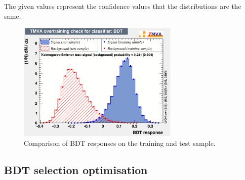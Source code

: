 The given values represent the confidence values that the distributions are the same.
\begin{figure}[tbp]
    \centering
    \includegraphics[width=0.7\textwidth]{07selection/figs/overtrain_BDT.pdf}
    \caption{Comparison of \ac{BDT} responses on the training and test sample.}
    \label{fig:BDTOVertraining}
\end{figure}

\subsection{BDT selection optimisation}
\label{sec:BDTOpt}

